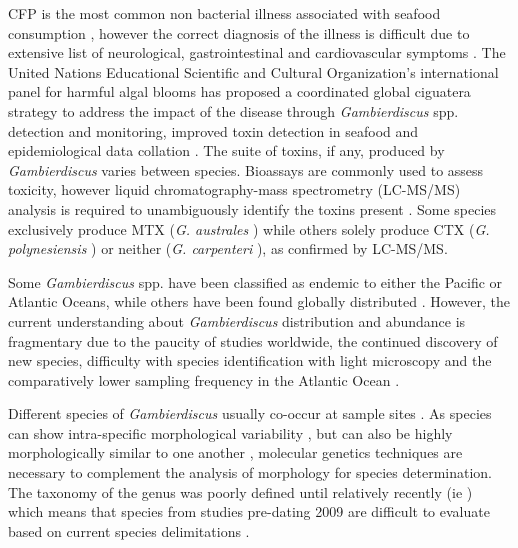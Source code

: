 \documentclass[12pt]{article}
\begin{document}
CFP is the most common non bacterial illness associated with seafood consumption \citep{friedman2008ciguatera}, however the correct diagnosis of the illness is difficult due to extensive list of neurological, gastrointestinal and cardiovascular symptoms \citep{sims1987theoretical}. 
The United Nations Educational Scientific and Cultural Organization's international panel for harmful algal blooms has proposed a coordinated global ciguatera strategy to address the impact of the disease through \emph{Gambierdiscus} spp. detection and monitoring, improved toxin detection in seafood and epidemiological data collation \citep{globalcig}.
The suite of toxins, if any, produced by \emph{Gambierdiscus} varies between species. 
Bioassays are commonly used to assess toxicity, however liquid chromatography-mass spectrometry (LC-MS/MS) analysis is required to unambiguously identify the toxins present \citep{diogened2014chemistry}. 
Some species exclusively produce MTX (\emph{G. australes} \citep{rhodes2014production}) while others solely produce CTX (\emph{G. polynesiensis} \citep{rhodes2014production}) or neither (\emph{G. carpenteri} \citep{kohli2014high}), as confirmed by LC-MS/MS. 

Some \emph{Gambierdiscus} spp. have been classified as endemic to either the Pacific or Atlantic Oceans, while others have been found globally distributed \citep{berdalet2012global,litaker2010global}. %
However, the current understanding about \emph{Gambierdiscus} distribution and abundance is fragmentary due to the paucity of studies worldwide, the continued discovery of new species, difficulty with species identification with light microscopy and the comparatively lower sampling frequency in the Atlantic Ocean \citep{berdalet2012global,nishimura2014morphology}. 

Different species of \emph{Gambierdiscus} usually co-occur at sample sites \citep{litaker2010global}. 
As species can show intra-specific morphological variability \citep{bravo2014cellular}, but can also be highly morphologically similar to one another \citep{kohli2014high}, molecular genetics techniques are necessary to complement the analysis of morphology for species determination. 
The taxonomy of the genus was poorly defined until relatively recently (ie \citep{litaker2009taxonomy,richlen2008phylogeography}) which means that species from studies pre-dating 2009 are difficult to evaluate based on current species delimitations \citep{berdalet2012global}. %
\end{document}
